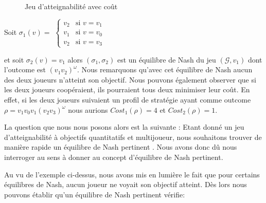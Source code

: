 \begin{figure}[ht!]
	\centering

	
	\caption{Jeu d'atteignabilité avec coût}
	\label{ex:patologique}
	

\end{figure}

Soit $\sigma _{1}(v) =$ $\begin{cases}
						v_{2} & \text{si } v = v_{1} \\
						v_{1 } & \text{si } v = v_{0} \\
						v_{2} & \text{si } v = v_{3} 
						\end{cases}$
						
						
						
\noindent et soit $\sigma _{2}(v) = v_{1}$ alors $(\sigma _{1},\sigma _{2})$ est un équilibre de Nash du jeu $(\mathcal{G},v_{1})$ dont l'outcome est $(v_{1}v_{2})^{\omega}$. Nous remarquons qu'avec cet équilibre de Nash aucun des deux joueurs n'atteint son objectif. Nous pouvons également observer que si les deux joueurs coopéraient, ils pourraient tous deux minimiser leur coût. En effet, si les deux joueurs suivaient un profil de stratégie ayant comme outcome $\rho = v_{1}v_{0}v_{1}(v_{2}v_{3})^{\omega} $ nous aurions $Cost_{1}(\rho) = 4$ et $Cost_{2}(\rho) = 1$.

La question que nous nous posons alors est la suivante : \og Etant donné un jeu d'atteignabilité à objectifs quantitatifs et multijoueur, nous souhaitons trouver de manière rapide un équilibre de Nash pertinent \fg. Nous avons donc dû nous interroger au sens à donner au concept d'équilibre de Nash pertinent.

Au vu de l'exemple ci-dessus, nous avons mis en lumière le fait que pour certains équilibres de Nash, aucun joueur ne voyait son objectif atteint. Dès lors nous pouvons établir qu'un équilibre de Nash pertinent vérifie:

